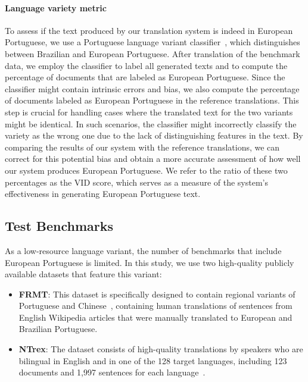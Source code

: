 \paragraph{Language variety metric}
To assess if the text produced by our translation system is indeed in European Portuguese, we use a Portuguese language variant classifier~\cite{Sousa2025}, which distinguishes between Brazilian and European Portuguese.
After translation of the benchmark data, we employ the classifier to label all generated texts and to compute the percentage of documents that are labeled as European Portuguese. 
Since the classifier might contain intrinsic errors and bias, we also compute the percentage of documents labeled as European Portuguese in the reference translations. 
This step is crucial for handling cases where the translated text for the two variants might be identical. 
In such scenarios, the classifier might incorrectly classify the variety as the wrong one due to the lack of distinguishing features in the text. 
By comparing the results of our system with the reference translations, we can correct for this potential bias and obtain a more accurate assessment of how well our system produces European Portuguese. 
We refer to the ratio of these two percentages as the VID score, which serves as a measure of the system's effectiveness in generating European Portuguese text.

\subsection{Test Benchmarks}
As a low-resource language variant, the number of benchmarks that include European Portuguese is limited. 
In this study, we use two high-quality publicly available datasets that feature this variant:
\begin{itemize}
    \item \textbf{FRMT}: This dataset is specifically designed to contain regional variants of Portuguese and Chinese~\cite{Riley2023}, containing human translations of sentences from English Wikipedia articles that were manually translated to European and Brazilian Portuguese. 
    
    \item \textbf{NTrex}: The dataset consists of high-quality translations by speakers who are bilingual in English and in one of the 128 target languages, including 123 documents and 1,997 sentences for each language~\cite{Federmann2022}.
\end{itemize}

